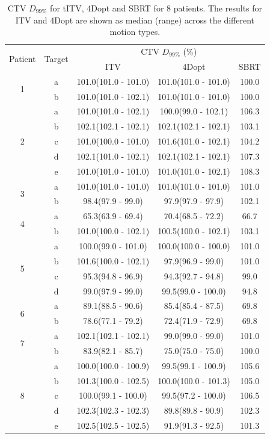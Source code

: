 \begin{table}[H]
	\centering
	\caption{CTV $D_{99\%}$ for tITV, 4Dopt and SBRT for 8 patients. The results for ITV and 4Dopt are shown as median (range) across the different motion types.}
	\begin{tabular}{|c|c|c|c|c|}
		\hline\hline
		\multirow{2}{*}{Patient} & \multirow{2}{*}{Target} & \multicolumn{3}{|c}{CTV $D_{99\%}$ (\%)}  \\
		 &  & ITV & 4Dopt & SBRT \\
		 \hline
		 
\multirow{2}{*}{1} & a & 101.0(101.0 - 101.0) & 101.0(101.0 - 101.0) & 100.0\\ 
 & b & 101.0(101.0 - 102.1) & 101.0(101.0 - 101.0) & 100.0\\ 
 \hline
\multirow{5}{*}{2} & a & 101.0(101.0 - 102.1) & 100.0(99.0 - 102.1) & 106.3\\ 
 & b & 102.1(102.1 - 102.1) & 102.1(102.1 - 102.1) & 103.1\\ 
 & c & 101.0(100.0 - 101.0) & 101.6(101.0 - 102.1) & 104.2\\ 
 & d & 102.1(101.0 - 102.1) & 102.1(102.1 - 102.1) & 107.3\\ 
 & e & 101.0(101.0 - 101.0) & 101.0(101.0 - 102.1) & 108.3\\ 
 \hline
\multirow{2}{*}{3} & a & 101.0(101.0 - 101.0) & 101.0(101.0 - 101.0) & 101.0\\ 
 & b & 98.4(97.9 - 99.0) & 97.9(97.9 - 97.9) & 102.1\\ 
 \hline
\multirow{2}{*}{4} & a & 65.3(63.9 - 69.4) & 70.4(68.5 - 72.2) & 66.7\\ 
 & b & 101.0(100.0 - 102.1) & 100.5(100.0 - 102.1) & 103.1\\ 
 \hline
\multirow{4}{*}{5} & a & 100.0(99.0 - 101.0) & 100.0(100.0 - 100.0) & 101.0\\ 
 & b & 101.6(100.0 - 102.1) & 97.9(96.9 - 99.0) & 101.0\\ 
 & c & 95.3(94.8 - 96.9) & 94.3(92.7 - 94.8) & 99.0\\ 
 & d & 99.0(97.9 - 99.0) & 99.5(99.0 - 100.0) & 94.8\\ 
 \hline
\multirow{2}{*}{6} & a & 89.1(88.5 - 90.6) & 85.4(85.4 - 87.5) & 69.8\\ 
 & b & 78.6(77.1 - 79.2) & 72.4(71.9 - 72.9) & 69.8\\ 
 \hline
\multirow{2}{*}{7} & a & 102.1(102.1 - 102.1) & 99.0(99.0 - 99.0) & 101.0\\ 
 & b & 83.9(82.1 - 85.7) & 75.0(75.0 - 75.0) & 100.0\\ 
 \hline
\multirow{5}{*}{8} & a & 100.0(100.0 - 100.9) & 99.5(99.1 - 100.9) & 105.6\\ 
 & b & 101.3(100.0 - 102.5) & 100.0(100.0 - 101.3) & 105.0\\ 
 & c & 100.0(99.1 - 100.0) & 99.5(97.2 - 100.0) & 106.5\\ 
 & d & 102.3(102.3 - 102.3) & 89.8(89.8 - 90.9) & 102.3\\ 
 & e & 102.5(102.5 - 102.5) & 91.9(91.3 - 92.5) & 101.3\\ 
 \hline

\hline\hline
	\end{tabular}
	\label{tab:resultsComplex}
\end{table}
\newpage
